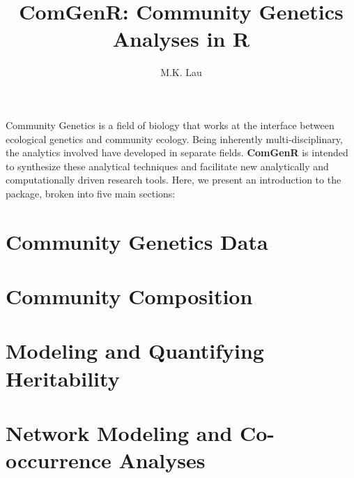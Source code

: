 \documentclass[12pt]{article}
\title{ComGenR: Community Genetics Analyses in R}
\author{M.K. Lau}
\begin{document}
\maketitle

Community Genetics is a field of biology that works at the interface
between ecological genetics and community ecology. Being inherently
multi-disciplinary, the analytics involved have developed in separate
fields. \textbf{ComGenR} is intended to synthesize these analytical
techniques and facilitate new analytically and computationally driven
research tools. Here, we present an introduction to the package,
broken into five main sections:

\setcounter{tocdepth}{3}  %
\tableofcontents  

\section{Community Genetics Data}


\section{Community Composition}




\section{Modeling and Quantifying Heritability}


\section{Network Modeling and Co-occurrence Analyses}

\end{document}
